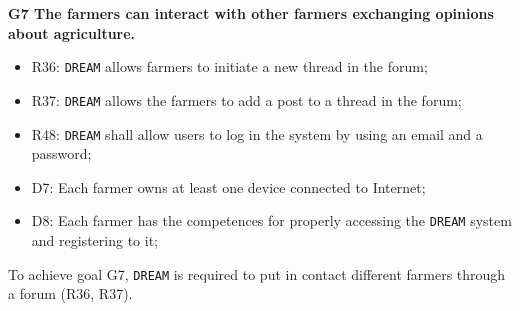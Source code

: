 \documentclass{article}
\begin{document}
\vspace{5mm}
\textbf{G7 The farmers can interact with other farmers exchanging opinions about agriculture.}
\begin{itemize}
    \item R36: \verb|DREAM| allows farmers to initiate a new thread in the forum;
  
    \item R37: \verb|DREAM| allows the farmers to add a post to a thread in the forum;
    
    \item R48: \verb|DREAM| shall allow users to log in the system by using an email and a password;
    
    \item D7: Each farmer owns at least one device connected to Internet;
    
    \item D8: Each farmer has the competences for properly accessing the \verb|DREAM| system and registering to it;
  
\end{itemize}
To achieve goal G7, \verb|DREAM| is required to put in contact different farmers through a forum (R36, R37).
\end{document}

